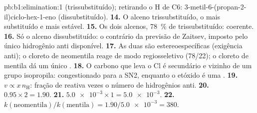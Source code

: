 \begin{solution}{pb:b1:elimination:1}
(trissubstituído); retirando o H de C6: 3-metil-6-(propan-2-il)ciclo-hex-1-eno
(dissubstituído).
\textbf{14.} O alceno trissubstituído, o mais substituído e mais estável.
\textbf{15.} Os dois alcenos, \qty{78}{\percent} de trissubstituído:
coerente.
\textbf{16.} Só o alceno dissubstituído: o contrário da previsão de
Zaitsev, imposto pelo único hidrogênio anti disponível.
\textbf{17.} As duas são estereoespecíficas (exigência anti); o cloreto
de neomentila reage de modo regiosseletivo (78/22); o cloreto de mentila
dá um único .
\textbf{18.} O carbono que leva o Cl é secundário e vizinho de um grupo
isopropila: congestionado para a SN2, enquanto o etóxido é uma .
\textbf{19.} $v \propto x\,n_{\mathrm{H}}$: fração de  reativa
vezes o número de hidrogênios anti.
\textbf{20.} $0.95 \times 2 = 1.90$.
\textbf{21.} $\num{5.0e-3} \times 1 = \num{5.0e-3}$.
\textbf{22.} \textbf{$k(\text{neomentila})/k(\text{mentila}) = 1.90/\num{5.0e-3}
= 380$}.
\end{solution}
